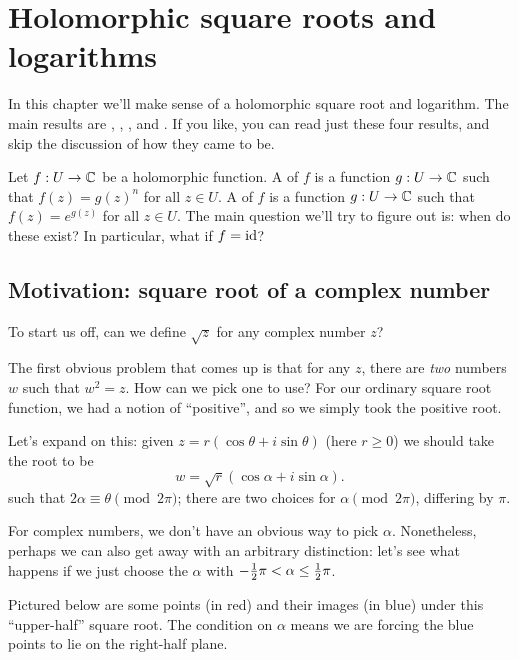 \chapter{Holomorphic square roots and logarithms}
\label{ch:complex_log}
In this chapter we'll make sense of a holomorphic square root and logarithm.
The main results are , ,
, and .
If you like, you can read just these four results, and skip the discussion of how they came to be.

Let $f : U \to \mathbb C$ be a holomorphic function.
A  of $f$ is a function $g : U \to \mathbb C$
such that $f(z) = g(z)^n$ for all $z \in U$.
A  of $f$ is a function $g : U \to \mathbb C$
such that $f(z) = e^{g(z)}$ for all $z \in U$.
The main question we'll try to figure out is: when do these exist?
In particular, what if $f = \mathrm{id}$?

\section{Motivation: square root of a complex number}
To start us off, can we define $\sqrt z$ for any complex number $z$?

The first obvious problem that comes up is that for any $z$, there are
\emph{two} numbers $w$ such that $w^2 = z$.
How can we pick one to use?
For our ordinary square root function, we had a notion of ``positive'',
and so we simply took the positive root.

Let's expand on this: given
$ z = r \left( \cos\theta + i \sin\theta \right) $
(here $r \ge 0$) we should take the root to be
\[ w = \sqrt{r} \left( \cos \alpha + i \sin \alpha \right). \]
such that $2\alpha \equiv \theta \pmod{2\pi}$;
there are two choices for $\alpha \pmod{2\pi}$, differing by $\pi$.

For complex numbers, we don't have an obvious way to pick $\alpha$.
Nonetheless, perhaps we can also get away with an arbitrary distinction:
let's see what happens if we just choose the $\alpha$ with $-\frac{1}{2}\pi < \alpha \le \frac{1}{2}\pi$.

Pictured below are some points (in red)
and their images (in blue) under this ``upper-half'' square root.
The condition on $\alpha$ means we are forcing the blue points to lie on the right-half plane.


